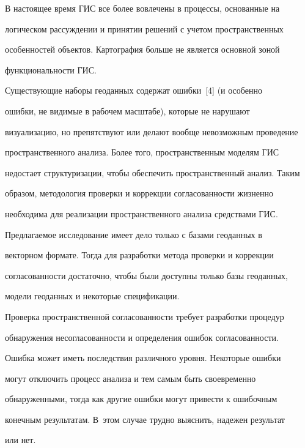     


    В настоящее время ГИС все более вовлечены в процессы, основанные на 


логическом рассуждении и принятии решений с учетом пространственных 


особенностей объектов. Картография больше не является основной зоной 


функциональности ГИС. 


    


    Существующие наборы геоданных содержат ошибки~[4] (и особенно 


ошибки, не видимые в рабочем масштабе), которые не нарушают 


визуализацию, но препятствуют или делают вообще невозможным проведение 


пространственного анализа. Более того, пространственным моделям ГИС 


недостает структуризации, чтобы обеспечить пространственный анализ. Таким 


образом, методология проверки и коррекции согласованности жизненно 


необходима для реализации пространственного анализа средствами ГИС. 


    


    Предлагаемое исследование имеет дело только с базами геоданных в 


векторном формате. Тогда для разработки метода проверки и коррекции 


согла\-со\-ван\-ности достаточно, чтобы были доступны только базы геоданных, 


модели геоданных и некоторые спецификации. 


    


    Проверка пространственной согласованности требует разработки процедур 


обнаружения несогласованности и определения ошибок согласованности. 


Ошибка может иметь последствия различного уровня. Некоторые ошибки 


могут отключить процесс анализа и тем самым быть своевременно 


обнаруженными, тогда как другие ошибки  могут привести к ошибочным 


конечным результатам. В~этом случае трудно выяснить, надежен результат 


или нет. 


